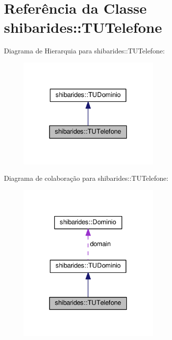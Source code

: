 \hypertarget{classshibarides_1_1TUTelefone}{}\section{Referência da Classe shibarides\+:\+:T\+U\+Telefone}
\label{classshibarides_1_1TUTelefone}


Diagrama de Hierarquia para shibarides\+:\+:T\+U\+Telefone\+:\nopagebreak
\begin{figure}[H]
\begin{center}
\leavevmode
\includegraphics[width=198pt]{classshibarides_1_1TUTelefone__inherit__graph}
\end{center}
\end{figure}


Diagrama de colaboração para shibarides\+:\+:T\+U\+Telefone\+:\nopagebreak
\begin{figure}[H]
\begin{center}
\leavevmode
\includegraphics[width=198pt]{classshibarides_1_1TUTelefone__coll__graph}
\end{center}
\end{figure}
